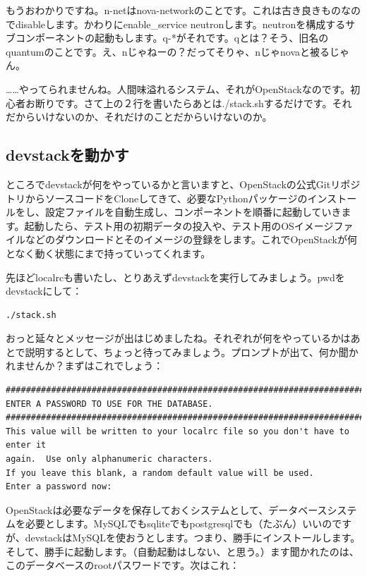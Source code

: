 \documentclass[8pt,b5paper,tombo,openany]{jsbook}
\begin{document}
もうおわかりですね。n-netはnova-networkのことです。これは古き良きものなのでdisableします。かわりにenable\_service neutronします。neutronを構成するサブコンポーネントの起動もします。q-*がそれです。qとは？そう、旧名のquantumのことです。え、nじゃねーの？だってそりゃ、nじゃnovaと被るじゃん。

……やってられませんね。人間味溢れるシステム、それがOpenStackなのです。初心者お断りです。さて上の２行を書いたらあとは./stack.shするだけです。それだからいけないのか、それだけのことだからいけないのか。

\subsection{devstackを動かす}

ところでdevstackが何をやっているかと言いますと、OpenStackの公式GitリポジトリからソースコードをCloneしてきて、必要なPythonパッケージのインストールをし、設定ファイルを自動生成し、コンポーネントを順番に起動していきます。起動したら、テスト用の初期データの投入や、テスト用のOSイメージファイルなどのダウンロードとそのイメージの登録をします。これでOpenStackが何となく動く状態にまで持っていってくれます。

先ほどlocalrcも書いたし、とりあえずdevstackを実行してみましょう。pwdをdevstackにして：

\begin{lstlisting}
./stack.sh
\end{lstlisting}

おっと延々とメッセージが出はじめましたね。それぞれが何をやっているかはあとで説明するとして、ちょっと待ってみましょう。プロンプトが出て、何か聞かれませんか？まずはこれでしょう：

\begin{lstlisting}
################################################################################
ENTER A PASSWORD TO USE FOR THE DATABASE.
################################################################################
This value will be written to your localrc file so you don't have to enter it
again.  Use only alphanumeric characters.
If you leave this blank, a random default value will be used.
Enter a password now:
\end{lstlisting}

OpenStackは必要なデータを保存しておくシステムとして、データベースシステムを必要とします。MySQLでもsqliteでもpostgresqlでも（たぶん）いいのですが、devstackはMySQLを使おうとします。つまり、勝手にインストールします。そして、勝手に起動します。（自動起動はしない、と思う。）ます聞かれたのは、このデータベースのrootパスワードです。次はこれ：
\end{document}
